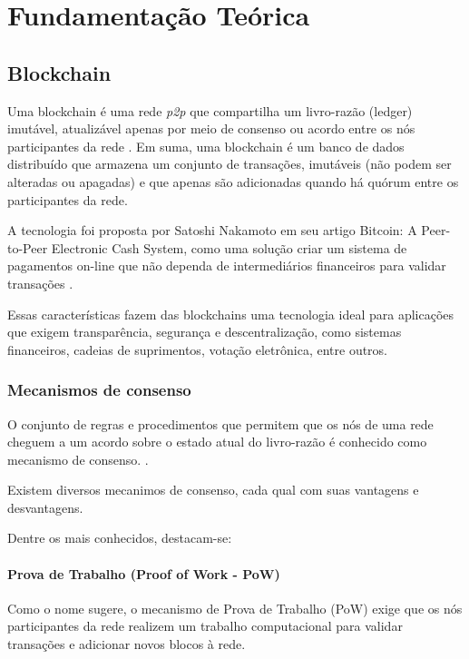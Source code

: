 \chapter[Fundamentação Teórica]{Fundamentação Teórica}

\section{Blockchain}

Uma blockchain é uma rede \textit{p2p} que compartilha um livro-razão
(ledger) imutável, atualizável apenas por meio de consenso ou acordo
entre os nós participantes da rede \cite{MasteringBlockchain}. Em suma,
uma blockchain é um banco de dados distribuído que armazena um conjunto de
transações, imutáveis (não podem ser alteradas ou apagadas) e que apenas
são adicionadas quando há quórum entre os participantes da rede.

A tecnologia foi proposta por Satoshi Nakamoto em seu artigo Bitcoin:
A Peer-to-Peer Electronic Cash System, como uma solução criar um
sistema de pagamentos on-line que não dependa de intermediários
financeiros para validar transações \cite{Bitcoin}.

Essas características fazem das blockchains uma tecnologia ideal para
aplicações que exigem transparência, segurança e descentralização, como
sistemas financeiros, cadeias de suprimentos, votação eletrônica, entre
outros.

\subsection{Mecanismos de consenso}

O conjunto de regras e procedimentos que permitem que os nós de uma
rede cheguem a um acordo sobre o estado atual do livro-razão é
conhecido como mecanismo de consenso. \cite{MasteringBlockchain}.

Existem diversos mecanimos de consenso, cada qual com suas vantagens
e desvantagens.

Dentre os mais conhecidos, destacam-se:

\subsubsection{Prova de Trabalho (Proof of Work - PoW)}

Como o nome sugere, o mecanismo de Prova de Trabalho (PoW) exige que os
nós participantes da rede realizem um trabalho computacional para validar
transações e adicionar novos blocos à rede.


